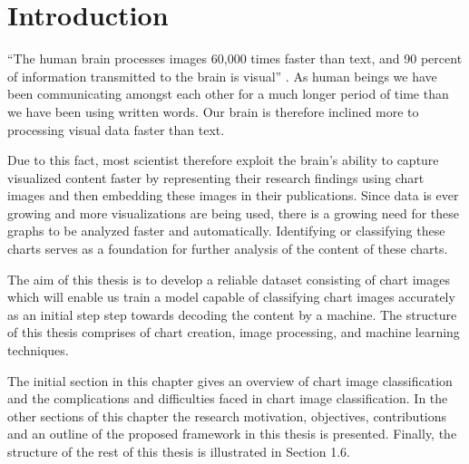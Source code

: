 \documentclass[12pt, a4paper,oneside]{report}
\begin{document}

\setcounter{tocdepth}{10}

\clearpage
\tableofcontents





\listoffigures
\listoftables

\titleformat{\chapter}{\LARGE\bfseries}{\thechapter}{1em}{}

\newpage


\newpage
\chapter{Introduction}
``The human brain processes images 60,000 times faster than text, and 90 percent of information transmitted to the brain is visual'' \cite{humaneye}. As human beings we have been communicating amongst each other for a much longer period of time than we have been using written words. Our brain is therefore inclined more to processing visual data faster than text.

Due to this fact, most scientist therefore exploit the brain's ability to capture visualized content faster by representing their research findings using chart images and then embedding these images in their publications. Since data is ever growing and more visualizations are being used, there is a growing need for these graphs to be analyzed faster and automatically. Identifying or classifying these charts serves as a foundation for further analysis of the content of these charts.  

The aim of this thesis is to develop a reliable dataset consisting of chart images which will enable us train a model capable of classifying chart images accurately as an initial step step towards decoding the content by a machine. The structure of this thesis comprises of chart creation, image processing, and machine learning techniques.

The initial section in this chapter gives an overview of chart image classification and the complications and difficulties faced in chart image classification. In the other sections of this chapter the research motivation, objectives, contributions and an outline of the proposed framework in this thesis is presented. Finally, the structure of the rest of this thesis is illustrated in Section 1.6.
\end{document}
